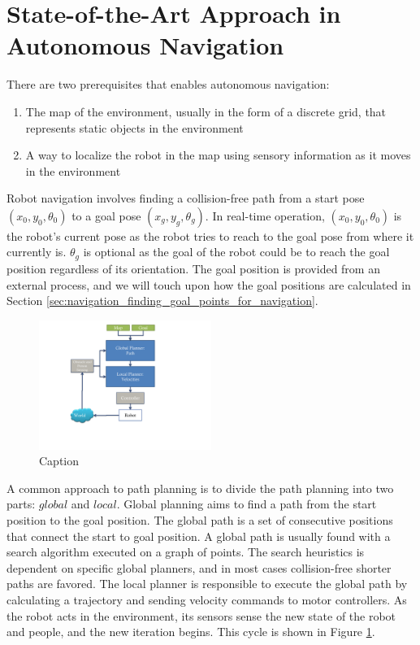 \section{State-of-the-Art Approach in Autonomous Navigation}
\label{sec:navigation_contemporary_navigation_practices}

There are two prerequisites that enables autonomous navigation: 

\begin{enumerate}
\item The map of the environment, usually in the form of a discrete grid, that represents static objects in the environment
\item A way to localize the robot in the map using sensory information as it moves in the environment
\end{enumerate}

Robot navigation involves finding a collision-free path from a start pose $(x_{0},y_{0},\theta_0)$ to a goal pose $(x_{g},y_{g},\theta_g)$. In real-time operation, $(x_{0},y_{0}, \theta_0)$ is the robot's current pose as the robot tries to reach to the goal pose from where it currently is. $\theta_g$ is optional as the goal of the robot could be to reach the goal position regardless of its orientation. The goal position is provided from an external process, and we will touch upon how the goal positions are calculated in Section \ref{sec:navigation_finding_goal_points_for_navigation}.



\begin{figure}[ht!]
\centering
\includegraphics[width=0.5\textwidth]{pics/navigation_overview}
\caption{Caption}
\label{fig:navigation_overview}
\end{figure}

A common approach to path planning is to divide the path planning into two parts: $global$ and $local$. Global planning aims to find a path from the start position to the goal position. The global path is a set of consecutive positions that connect the start to goal position. A global path is usually found with a search algorithm executed on a graph of points. The search heuristics is dependent on specific global planners, and in most cases collision-free shorter paths are favored. The local planner is responsible to execute the global path by calculating a trajectory and sending velocity commands to motor controllers. As the robot acts in the environment, its sensors sense the new state of the robot and people, and the new iteration begins. This cycle is shown in Figure \ref{fig:navigation_overview}. 

